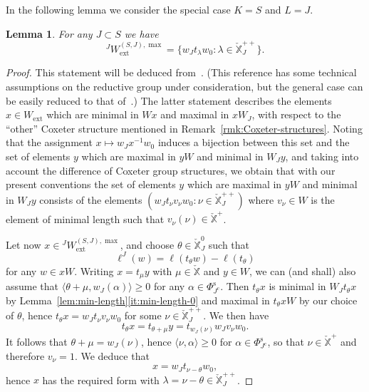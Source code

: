 \documentclass[11pt]{amsart}
\numberwithin{equation}{section}
\theoremstyle{plain}
\newtheorem{lem}[thm]{Lemma}
\theoremstyle{definition}
\newtheorem{rmk}[thm]{Remark}
\newcommand{\X}{{\mathbb X}}
\newcommand{\Xd}{\check{\X}}
\newcommand{\Phis}{\Phi^{\mathrm{s}}}
\newcommand{\ex}{\mathrm{ext}}
\newcommand{\comp}{\mathrm{c}}
\begin{document}

In the following lemma we consider the special case $K=S$ and $L=J$.

\begin{lem}
\label{lem:JSJw}
For any $J \subset S$ we have 
\[
{}^JW_\ex^{(S,J),\max}=\{w_Jt_\lambda w_0 : \lambda\in \Xd_J^{++}\}. 
\]
\end{lem}

\begin{proof}
This statement will be deduced from~\cite[Lemma~10.2]{AR18}. (This reference has some technical assumptions on the reductive group under consideration, but the general case can be easily reduced to that of~\cite{AR18}.) The latter statement describes the elements $x \in W_\ex$ which are minimal in $Wx$ and maximal in $xW_J$, with respect to the ``other'' Coxeter structure mentioned in Remark~\ref{rmk:Coxeter-structures}. Noting that the assignment $x \mapsto w_J x^{-1} w_0$ induces a bijection between this set and 
the set of elements $y$ which are maximal in $yW$ and minimal in $W_J y$, and taking into account the difference of Coxeter group structures, we obtain that with our present conventions the set of elements $y$ which are maximal in $yW$ and minimal in $W_J y$ consists of the elements $(w_J t_\nu v_\nu w_0 : \nu \in \Xd_J^{++})$ where $v_\nu \in W$ is the element of minimal length such that $v_\nu(\nu) \in \Xd^+$.

Let now $x \in {}^JW_\ex^{(S,J),\max}$, and choose $\theta \in \Xd_J^0$ such that
\[
\ell^J(w) = \ell(t_\theta w)-\ell(t_\theta)
\]
for any $w \in x W$. Writing $x=t_\mu y$ with $\mu \in \Xd$ and $y \in W$, we can (and shall) also assume that 
$\langle \theta+\mu, w_J(\alpha) \rangle \geq 0$ for any $\alpha \in \Phis_{J^\comp}$.
Then $t_\theta x$ is minimal in $W_J t_\theta x$ by Lemma~\ref{lem:min-length}\eqref{it:min-length-0} and maximal in $t_\theta x W$ by our choice of $\theta$, hence $t_\theta x = w_J t_\nu v_\nu w_0$ for some $\nu \in \Xd_J^{++}$. We then have
\[
t_\theta x = t_{\theta+\mu} y = t_{w_J(\nu)} w_J v_\nu w_0.
\]
It follows that $\theta+\mu = w_J(\nu)$, hence $\langle \nu, \alpha \rangle \geq 0$ for $\alpha \in \Phis_{J^\comp}$, so that $\nu \in \Xd^+$ and therefore $v_\nu=1$. We deduce that
\[
x = w_J t_{\nu-\theta} w_0,
\]
hence $x$ has the required form with $\lambda=\nu-\theta \in \Xd_J^{++}$.


\end{proof}
\end{document}
